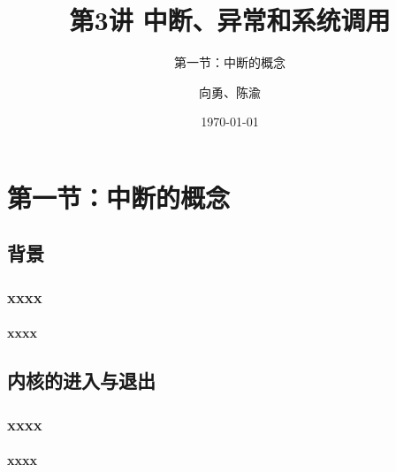 


\title[第3讲]{第3讲 中断、异常和系统调用} %
\subtitle{第一节：中断的概念}
\author{向勇、陈渝} %
\date{\today} %



\begin{frame}
\titlepage %
\end{frame}


\section{第一节：中断的概念}%

\subsection{背景} %
\begin{frame}
	\frametitle{xxxx}
	\framesubtitle{xxxx}
\end{frame}

\subsection{内核的进入与退出}
\begin{frame}
	\frametitle{xxxx}
	\framesubtitle{xxxx}
\end{frame}

